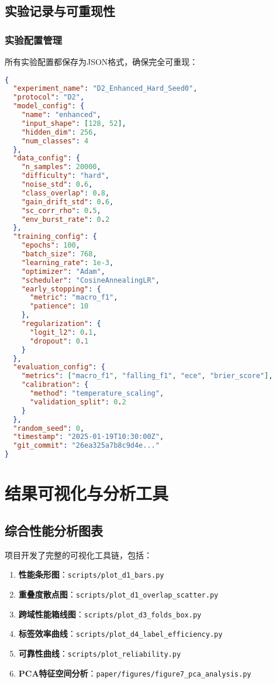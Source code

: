 \subsection{实验记录与可重现性}
\label{subsec:reproducibility}

\subsubsection{实验配置管理}
所有实验配置都保存为JSON格式，确保完全可重现：

\begin{lstlisting}[language=JSON,caption=实验配置示例]
{
  "experiment_name": "D2_Enhanced_Hard_Seed0",
  "protocol": "D2",
  "model_config": {
    "name": "enhanced",
    "input_shape": [128, 52],
    "hidden_dim": 256,
    "num_classes": 4
  },
  "data_config": {
    "n_samples": 20000,
    "difficulty": "hard",
    "noise_std": 0.6,
    "class_overlap": 0.8,
    "gain_drift_std": 0.6,
    "sc_corr_rho": 0.5,
    "env_burst_rate": 0.2
  },
  "training_config": {
    "epochs": 100,
    "batch_size": 768,
    "learning_rate": 1e-3,
    "optimizer": "Adam",
    "scheduler": "CosineAnnealingLR",
    "early_stopping": {
      "metric": "macro_f1",
      "patience": 10
    },
    "regularization": {
      "logit_l2": 0.1,
      "dropout": 0.1
    }
  },
  "evaluation_config": {
    "metrics": ["macro_f1", "falling_f1", "ece", "brier_score"],
    "calibration": {
      "method": "temperature_scaling",
      "validation_split": 0.2
    }
  },
  "random_seed": 0,
  "timestamp": "2025-01-19T10:30:00Z",
  "git_commit": "26ea325a7b8c9d4e..."
}
\end{lstlisting}

\section{结果可视化与分析工具}
\label{sec:visualization}

\subsection{综合性能分析图表}
\label{subsec:performance_visualization}

项目开发了完整的可视化工具链，包括：

\begin{enumerate}
\item \textbf{性能条形图}：\texttt{scripts/plot\_d1\_bars.py}
\item \textbf{重叠度散点图}：\texttt{scripts/plot\_d1\_overlap\_scatter.py}
\item \textbf{跨域性能箱线图}：\texttt{scripts/plot\_d3\_folds\_box.py}
\item \textbf{标签效率曲线}：\texttt{scripts/plot\_d4\_label\_efficiency.py}
\item \textbf{可靠性曲线}：\texttt{scripts/plot\_reliability.py}
\item \textbf{PCA特征空间分析}：\texttt{paper/figures/figure7\_pca\_analysis.py}
\end{enumerate}

